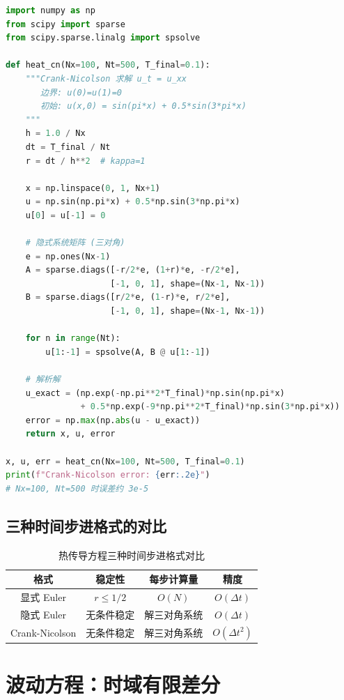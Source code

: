 \begin{lstlisting}[language=Python, caption=Crank-Nicolson 法求解热传导方程]
import numpy as np
from scipy import sparse
from scipy.sparse.linalg import spsolve

def heat_cn(Nx=100, Nt=500, T_final=0.1):
    """Crank-Nicolson 求解 u_t = u_xx
       边界: u(0)=u(1)=0
       初始: u(x,0) = sin(pi*x) + 0.5*sin(3*pi*x)
    """
    h = 1.0 / Nx
    dt = T_final / Nt
    r = dt / h**2  # kappa=1

    x = np.linspace(0, 1, Nx+1)
    u = np.sin(np.pi*x) + 0.5*np.sin(3*np.pi*x)
    u[0] = u[-1] = 0

    # 隐式系统矩阵 (三对角)
    e = np.ones(Nx-1)
    A = sparse.diags([-r/2*e, (1+r)*e, -r/2*e],
                     [-1, 0, 1], shape=(Nx-1, Nx-1))
    B = sparse.diags([r/2*e, (1-r)*e, r/2*e],
                     [-1, 0, 1], shape=(Nx-1, Nx-1))

    for n in range(Nt):
        u[1:-1] = spsolve(A, B @ u[1:-1])

    # 解析解
    u_exact = (np.exp(-np.pi**2*T_final)*np.sin(np.pi*x)
               + 0.5*np.exp(-9*np.pi**2*T_final)*np.sin(3*np.pi*x))
    error = np.max(np.abs(u - u_exact))
    return x, u, error

x, u, err = heat_cn(Nx=100, Nt=500, T_final=0.1)
print(f"Crank-Nicolson error: {err:.2e}")
# Nx=100, Nt=500 时误差约 3e-5
\end{lstlisting}

\subsection{三种时间步进格式的对比}

\begin{table}[h]
\centering
\caption{热传导方程三种时间步进格式对比}
\label{tab:time_stepping}
\begin{tabular}{c|c|c|c}
\toprule
格式 & 稳定性 & 每步计算量 & 精度 \\
\midrule
显式 Euler & $r \leq 1/2$ & $O(N)$ & $O(\Delta t)$ \\
隐式 Euler & 无条件稳定 & 解三对角系统 & $O(\Delta t)$ \\
Crank-Nicolson & 无条件稳定 & 解三对角系统 & $O(\Delta t^2)$ \\
\bottomrule
\end{tabular}
\end{table}

\section{波动方程：时域有限差分}
\label{sec:wave_fd}

